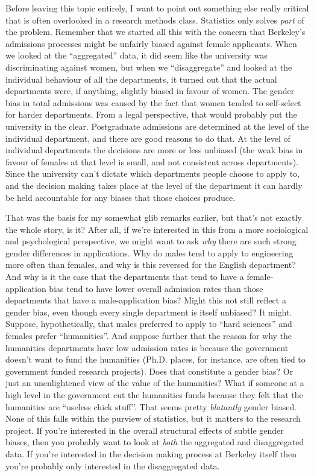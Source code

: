 Before leaving this topic entirely, I want to point out something else really critical that is often overlooked in a research methods class. Statistics only solves {\it part} of the problem. Remember that we started all this with the concern that Berkeley's admissions processes might be unfairly biased against female applicants. When we looked at the ``aggregated'' data, it did seem like the university was discriminating against women, but when we ``disaggregate'' and looked at the individual behaviour of all the departments, it turned out that the actual departments were, if anything, slightly biased in favour of women. The gender bias in total admissions was caused by the fact that women tended to self-select for harder departments.  From a legal perspective, that would probably put the university in the clear. Postgraduate admissions are determined at the level of the individual department, and there are good reasons to do that. At the level of individual departments the decisions are more or less unbiased (the weak bias in favour of females at that level is small, and not consistent across departments). Since the university can't dictate which departments people choose to apply to, and the decision making takes place at the level of the department it can hardly be held accountable for any biases that those choices produce. 

That was the basis for my somewhat glib remarks earlier, but that's not exactly the whole story, is it? After all, if we're interested in this from a more sociological and psychological perspective, we might want to ask {\it why} there are such strong gender differences in applications. Why do males tend to apply to engineering more often than females, and why is this reversed for the English department? And why is it the case that the departments that tend to have a female-application bias tend to have lower overall admission rates than those departments that have a male-application bias? Might this not still reflect a gender bias, even though every single department is itself unbiased? It might. Suppose, hypothetically, that males preferred to apply to ``hard sciences'' and females prefer ``humanities''. And suppose further that the reason for why the humanities departments have low admission rates is  because the government doesn't want to fund the humanities (Ph.D. places, for instance, are often tied to government funded research projects). Does that constitute a gender bias? Or just an unenlightened view of the value of the humanities? What if someone at a high level in the government cut the humanities funds because they felt that the humanities are ``useless chick stuff''. That seems pretty {\it blatantly} gender biased. None of this falls within the purview of statistics, but it matters to the research project. If you're interested in the overall structural effects of subtle gender biases, then you probably want to look at {\it both} the aggregated and disaggregated data. If you're interested in the decision making process at Berkeley itself then you're probably only interested in the disaggregated data. 

